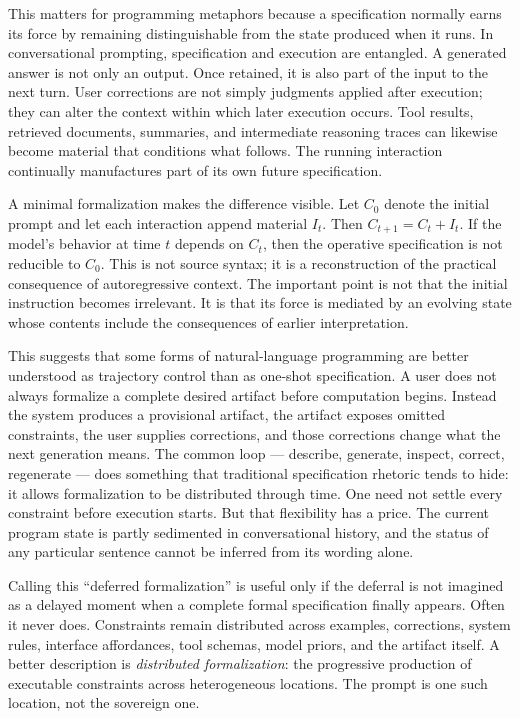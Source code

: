 \documentclass[11pt]{article}
\begin{document}
This matters for programming metaphors because a specification normally earns its force by remaining distinguishable from the state produced when it runs. In conversational prompting, specification and execution are entangled. A generated answer is not only an output. Once retained, it is also part of the input to the next turn. User corrections are not simply judgments applied after execution; they can alter the context within which later execution occurs. Tool results, retrieved documents, summaries, and intermediate reasoning traces can likewise become material that conditions what follows. The running interaction continually manufactures part of its own future specification.

A minimal formalization makes the difference visible. Let $C_0$ denote the initial prompt and let each interaction append material $I_t$. Then $C_{t+1} = C_t + I_t$. If the model's behavior at time $t$ depends on $C_t$, then the operative specification is not reducible to $C_0$. This is not source syntax; it is a reconstruction of the practical consequence of autoregressive context. The important point is not that the initial instruction becomes irrelevant. It is that its force is mediated by an evolving state whose contents include the consequences of earlier interpretation.

This suggests that some forms of natural-language programming are better understood as trajectory control than as one-shot specification. A user does not always formalize a complete desired artifact before computation begins. Instead the system produces a provisional artifact, the artifact exposes omitted constraints, the user supplies corrections, and those corrections change what the next generation means. The common loop --- describe, generate, inspect, correct, regenerate --- does something that traditional specification rhetoric tends to hide: it allows formalization to be distributed through time. One need not settle every constraint before execution starts. But that flexibility has a price. The current program state is partly sedimented in conversational history, and the status of any particular sentence cannot be inferred from its wording alone.

Calling this ``deferred formalization'' is useful only if the deferral is not imagined as a delayed moment when a complete formal specification finally appears. Often it never does. Constraints remain distributed across examples, corrections, system rules, interface affordances, tool schemas, model priors, and the artifact itself. A better description is \emph{distributed formalization}: the progressive production of executable constraints across heterogeneous locations. The prompt is one such location, not the sovereign one.
\end{document}
